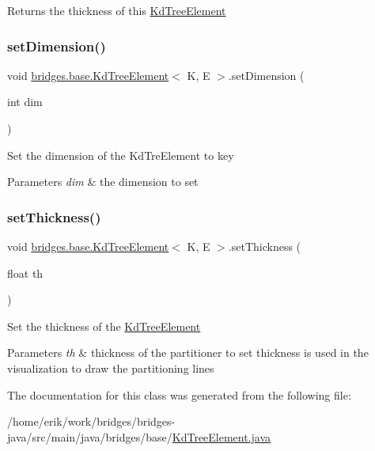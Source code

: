 \begin{DoxyReturn}{Returns}
the thickness of this \hyperlink{classbridges_1_1base_1_1_kd_tree_element}{Kd\+Tree\+Element} 
\end{DoxyReturn}
\mbox{\label{classbridges_1_1base_1_1_kd_tree_element_af3fa89cbd20fc2c3f30784db16b6dec4}} 
\subsubsection{\texorpdfstring{set\+Dimension()}{setDimension()}}
{\footnotesize\ttfamily void \hyperlink{classbridges_1_1base_1_1_kd_tree_element}{bridges.\+base.\+Kd\+Tree\+Element}$<$ K, E $>$.set\+Dimension (\begin{DoxyParamCaption}\item[{int}]{dim }\end{DoxyParamCaption})}

Set the dimension of the Kd\+Tre\+Element to key 
\begin{DoxyParams}{Parameters}
{\em dim} & the dimension to set \\
\hline
\end{DoxyParams}
\mbox{\label{classbridges_1_1base_1_1_kd_tree_element_a52412fc59c743a8a0ede057ed2451be9}} 
\subsubsection{\texorpdfstring{set\+Thickness()}{setThickness()}}
{\footnotesize\ttfamily void \hyperlink{classbridges_1_1base_1_1_kd_tree_element}{bridges.\+base.\+Kd\+Tree\+Element}$<$ K, E $>$.set\+Thickness (\begin{DoxyParamCaption}\item[{float}]{th }\end{DoxyParamCaption})}

Set the thickness of the \hyperlink{classbridges_1_1base_1_1_kd_tree_element}{Kd\+Tree\+Element} 
\begin{DoxyParams}{Parameters}
{\em th} & thickness of the partitioner to set thickness is used in the visualization to draw the partitioning lines \\
\hline
\end{DoxyParams}


The documentation for this class was generated from the following file\+:\begin{DoxyCompactItemize}
\item 
/home/erik/work/bridges/bridges-\/java/src/main/java/bridges/base/\hyperlink{_kd_tree_element_8java}{Kd\+Tree\+Element.\+java}\end{DoxyCompactItemize}
